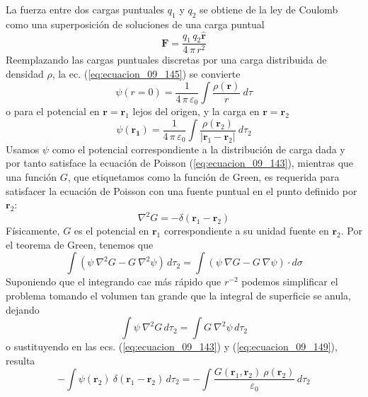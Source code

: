 La fuerza entre dos cargas puntuales $q_{1}$ y $q_{2}$ se obtiene de la ley de Coulomb como una superposición de soluciones de una carga puntual 
\begin{equation}
\bm{F} = \dfrac{q_{1} \, q_{2} \hat{\bm{r}}}{4 \, \pi \, r^{2}}
\label{eq:ecuacion_09_146}
\end{equation}
Reemplazando las cargas puntuales discretas por una carga distribuida de densidad $\rho$, la ec. (\ref{eq:ecuacion_09_145}) se convierte
\begin{equation}
\psi (r=0) = \dfrac{1}{4 \, \pi \, \varepsilon_{0}} \int \dfrac{\rho(\bm{r})}{r} \: d \tau
\label{eq:ecuacion_09_147}
\end{equation}
o para el potencial en $\bm{r} = \bm{r}_{1}$ lejos del origen, y la carga en $\bm{r} = \bm{r}_{2}$
\begin{equation}
\psi (\bm{r_{1}}) = \dfrac{1}{4 \, \pi \, \varepsilon_{0}} \int \dfrac{\rho(\bm{r}_{2})}{\vert \bm{r}_{1} - \bm{r}_{2} \vert} \: d \tau_{2}
\label{eq:ecuacion_09_148}
\end{equation}
Usamos $\psi$ como el potencial correspondiente a la distribución de carga dada y por tanto satisface la ecuación de Poisson (\ref{eq:ecuacion_09_143}), mientras que una función $G$, que etiquetamos como la función de Green, es requerida para satisfacer la ecuación de Poisson con una fuente puntual en el punto definido por $\bm{r}_{2}$:
\begin{equation}
\nabla^{2} G = - \delta (\bm{r}_{1} - \bm{r}_{2})
\label{eq:ecuacion_09_149}
\end{equation}
Físicamente, $G$ es el potencial en $\bm{r}_{1}$ correspondiente a su unidad fuente en $\bm{r}_{2}$. Por el teorema de Green, tenemos que
\begin{equation}
\int (\psi \: \nabla^{2} G - G \: \nabla^{2} \psi) \, d \tau_{2} = \int (\psi \: \nabla G - G \: \nabla \psi) \cdot d \sigma
\label{eq:ecuacion_09_150}
\end{equation}
Suponiendo que el integrando cae más rápido que $r^{-2}$ podemos simplificar el problema tomando el volumen tan grande que la integral de superficie se anula, dejando
\begin{equation}
\int \psi \: \nabla^{2} G \, d \tau_{2} = \int G \: \nabla^{2} \psi \, d \tau_{2}
\label{eq:ecuacion_09_151}
\end{equation}
o sustituyendo en las ecs. (\ref{eq:ecuacion_09_143}) y (\ref{eq:ecuacion_09_149}), resulta
\begin{equation}
- \int \psi(\bm{r}_{2}) \: \delta (\bm{r}_{1} - \bm{r}_{2}) \, d \tau_{2} = - \int \dfrac{G(\bm{r}_{1}, \bm{r}_{2}) \: \rho(\bm{r}_{2})}{\varepsilon_{0}} \, d \tau_{2}
\label{eq:ecuacion_09_152}
\end{equation}
